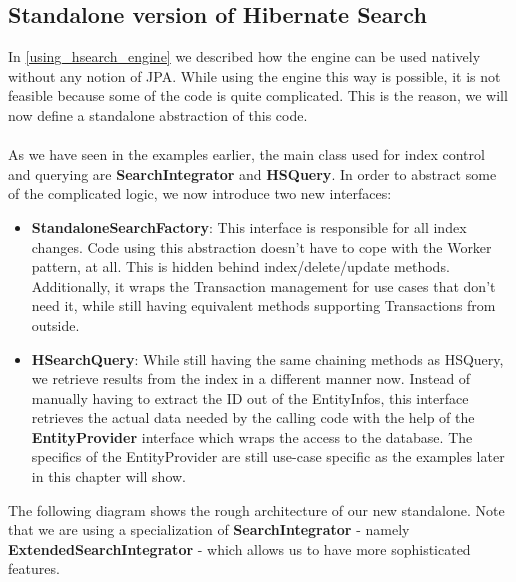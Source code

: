 \subsection{Standalone version of Hibernate Search}

In \ref{using_hsearch_engine} we described how the engine can be used natively without any notion of JPA. While using the engine this way is possible, it is not feasible because some of the code is quite complicated. This is the reason, we will now define a standalone abstraction of this code.
\\\\
As we have seen in the examples earlier, the main class used for index control and querying are \textbf{SearchIntegrator} and \textbf{HSQuery}. In order to abstract some of the complicated logic, we now introduce two new interfaces: 

\begin{itemize}
	\item \textbf{StandaloneSearchFactory}: This interface is responsible for all index changes. Code using this abstraction doesn't have to cope with the Worker pattern, at all. This is hidden behind index/delete/update methods. Additionally, it wraps the Transaction management for use cases that don't need it, while still having equivalent methods supporting Transactions from outside. 
	
	\item \textbf{HSearchQuery}: While still having the same chaining methods as HSQuery, we retrieve results from the index in a different manner now. Instead of manually having to extract the ID out of the EntityInfos, this interface retrieves the actual data needed by the calling code with the help of the \textbf{EntityProvider} interface which wraps the access to the database. The specifics of the EntityProvider are still use-case specific as the examples later in this chapter will show.
\end{itemize}
\noindent
The following diagram shows the rough architecture of our new standalone. Note that we are using a specialization of \textbf{SearchIntegrator} - namely \textbf{ExtendedSearchIntegrator} - which allows us to have more sophisticated features.


